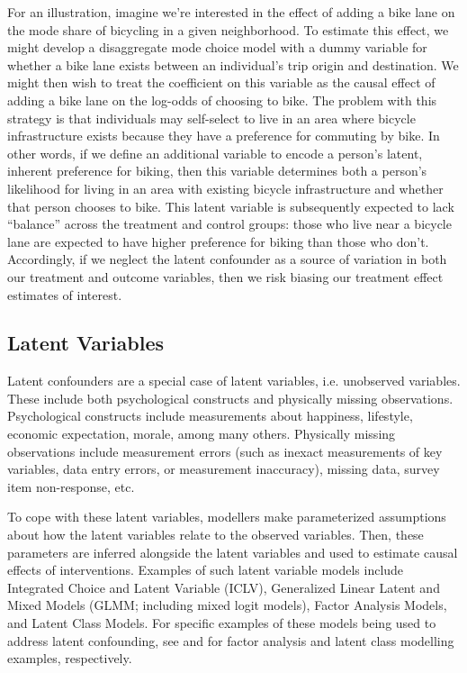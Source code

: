 For an illustration, imagine we're interested in the effect of adding a bike lane on the mode share of bicycling in a given neighborhood.
To estimate this effect, we might develop a disaggregate mode choice model with a dummy variable for whether a bike lane exists between an individual's trip origin and destination.
We might then wish to treat the coefficient on this variable as the causal effect of adding a bike lane on the log-odds of choosing to bike.
The problem with this strategy is that individuals may self-select to live in an area where bicycle infrastructure exists because they have a preference for commuting by bike.
In other words, if we define an additional variable to encode a person's latent, inherent preference for biking, then this variable determines both a person's likelihood for living in an area with existing bicycle infrastructure and whether that person chooses to bike.
This latent variable is subsequently expected to lack ``balance'' across the treatment and control groups: those who live near a bicycle lane are expected to have higher preference for biking than those who don't.
Accordingly, if we neglect the latent confounder as a source of variation in both our treatment and outcome variables,
then we risk biasing our treatment effect estimates of interest.

\subsection{Latent Variables}
\label{sec:latent-variables}
Latent confounders are a special case of latent variables, i.e. unobserved variables.
These include both psychological constructs and physically missing observations.
Psychological constructs include measurements about
happiness, lifestyle, economic expectation, morale, among many others.
Physically missing observations include measurement errors
(such as inexact measurements of key variables, data entry errors, or measurement inaccuracy),
missing data, survey item non-response, etc.

To cope with these latent variables, modellers make parameterized assumptions about how the latent variables relate to the observed variables.
Then, these parameters are inferred alongside the latent variables and used to estimate causal effects of interventions.
Examples of such latent variable models include Integrated Choice and Latent Variable (ICLV), Generalized Linear Latent and Mixed Models (GLMM; including mixed logit models), Factor Analysis Models, and Latent Class Models.
For specific examples of these models being used to address latent confounding, see \citet{louizos_2017_causal} and \citet{perrakis_2019_latent} for factor analysis and latent class modelling examples, respectively.

